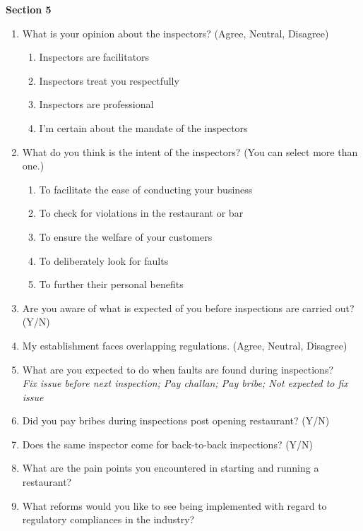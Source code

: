 \documentclass[a4paper, 12pt, twoside]{article}
\begin{document}
\begin{mdframed}[backgroundcolor=gray!20]
\textbf{Section 5}
		\begin {enumerate}[nosep]
		\item What is your opinion about the inspectors? (Agree, Neutral, Disagree)
			\begin {enumerate}[nosep]
			\item Inspectors are facilitators
			\item Inspectors treat you respectfully
			\item Inspectors are professional
			\item I’m certain about the mandate of the inspectors
			\end {enumerate}
		\item What do you think is the intent of the inspectors? (You can select more than one.)
			\begin {enumerate}[nosep]
			\item To facilitate the ease of conducting your business
			\item To check for violations in the restaurant or bar
			\item To ensure the welfare of your customers
			\item To deliberately look for faults
			\item To further their personal benefits
			\end {enumerate}
		\item Are you aware of what is expected of you before inspections are carried out?(Y/N)
		\item My establishment faces overlapping regulations. (Agree, Neutral, Disagree)
		\item What are you expected to do when faults are found during inspections?\\
		\textit{Fix issue before next inspection; Pay challan; Pay bribe; Not expected to fix issue}
		\item Did you pay bribes during inspections post opening restaurant? (Y/N)
		\item Does the same inspector come for back-to-back inspections? (Y/N)
		\item What are the pain points you encountered in starting and running a restaurant?
		\item What reforms would you like to see being implemented with regard to regulatory compliances in the industry?
		\end {enumerate}
		  \end{mdframed}
       

                    
                    
                    
\end{document}
